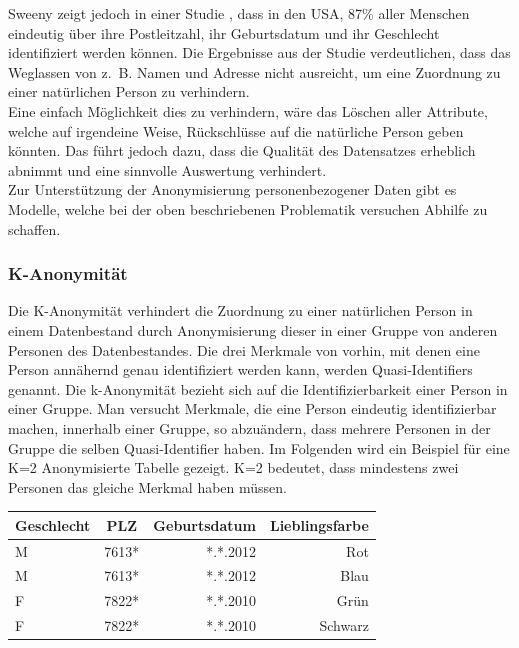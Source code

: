 \documentclass[a4paper, 12pt]{article}
\begin{document}
\noindent Sweeny zeigt jedoch in einer Studie \cite{IdentificationUSCitizens}, dass in den USA, 87\% aller Menschen eindeutig über ihre Postleitzahl, ihr Geburtsdatum und ihr Geschlecht identifiziert werden können. Die Ergebnisse aus der Studie verdeutlichen, dass das Weglassen von z.~B. Namen und Adresse nicht ausreicht, um eine Zuordnung zu einer natürlichen Person zu verhindern. \\

\noindent Eine einfach Möglichkeit dies zu verhindern, wäre das Löschen aller Attribute, welche auf irgendeine Weise, Rückschlüsse auf die natürliche Person geben könnten. Das führt jedoch dazu, dass die Qualität des Datensatzes erheblich abnimmt und eine sinnvolle Auswertung verhindert. \\

\noindent Zur Unterstützung der Anonymisierung personenbezogener Daten gibt es Modelle, welche bei der oben beschriebenen Problematik versuchen Abhilfe zu schaffen. \cite{AnonymisierungsMethoden}

\subsubsection*{K-Anonymität}

 Die K-Anonymität verhindert die Zuordnung zu einer natürlichen Person in einem Datenbestand durch Anonymisierung dieser in einer Gruppe von anderen Personen des Datenbestandes. Die drei Merkmale von vorhin, mit denen eine Person annähernd genau identifiziert werden kann, werden Quasi-Identifiers genannt. Die k-Anonymität bezieht sich auf die Identifizierbarkeit einer Person in einer Gruppe. Man versucht Merkmale, die eine Person eindeutig identifizierbar machen, innerhalb einer Gruppe, so abzuändern, dass mehrere Personen in der Gruppe die selben Quasi-Identifier haben. Im Folgenden wird ein Beispiel für eine K=2 Anonymisierte Tabelle gezeigt. K=2 bedeutet, dass mindestens zwei Personen das gleiche Merkmal haben müssen. \\
 
 \begin{tabular}{lcrr}
	
	Geschlecht & PLZ & Geburtsdatum & Lieblingsfarbe\\
	\hline
	M & 7613* & *.*.2012 & Rot \\
	M & 7613* & *.*.2012 & Blau \\
	F & 7822* & *.*.2010 & Grün \\
	F & 7822* &  *.*.2010 & Schwarz \\
	
\end{tabular}
\vspace{10mm}
\end{document}
